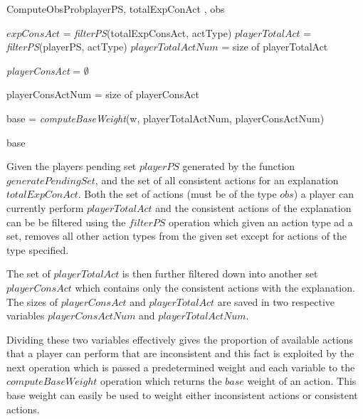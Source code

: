 \documentclass[parskip]{cs4rep}
\begin{document}
\begin{pseudocode}[ruled]{ComputeObsProb}{playerPS, totalExpConAct , obs}
\begin{algorithm}[H]
$expConsAct$ = \textit{filterPS}(totalExpConsAct, actType) \newline
$playerTotalAct$ = \textit{filterPS}(playerPS, actType)\newline
$playerTotalActNum$ = size of playerTotalAct \newline

\textit{playerConsAct} = $\emptyset$ \newline


playerConsActNum = size of playerConsAct\newline

base = \textit{computeBaseWeight}(w, playerTotalActNum, playerConsActNum)\newline

\Return base

\end{algorithm}
\end{pseudocode}

Given the players pending set $playerPS$ generated by the function $generatePendingSet$, and the set of all consistent actions for an explanation $totalExpConAct$. Both the set of actions (must be of the type $obs$) a player can currently perform $playerTotalAct$ and the consistent actions of the explanation can be be filtered using the $filterPS$ operation which given an action type ad a set, removes all other action types from the given set except for actions of the type specified. 

The set of $playerTotalAct$ is then further filtered down into another set $playerConsAct$ which contains only the consistent actions with the explanation. The sizes of $playerConsAct$ and $playerTotalAct$ are saved in two respective variables $playerConsActNum$ and $playerTotalActNum$.

Dividing these two variables effectively gives the proportion of available actions that a player can perform that are inconsistent and this fact is exploited by the next operation which is passed a predetermined weight and each variable to the $computeBaseWeight$ operation which returns the $base$ weight of an action. This base weight can easily be used to weight either inconsistent actions or consistent actions.
\end{document}
